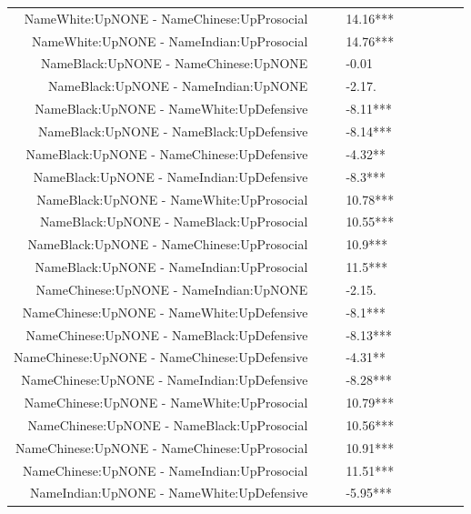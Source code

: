 \documentclass[]{report}
\begin{document}
\begin{table}[ht]
{\begin{tabular}{rllllllll}
		NameWhite:UpNONE - NameChinese:UpProsocial &  &  & 14.16*** &  &  &  &  &  \\ 
		NameWhite:UpNONE - NameIndian:UpProsocial &  &  & 14.76*** &  &  &  &  &  \\ 
		NameBlack:UpNONE - NameChinese:UpNONE &  &  & -0.01 &  &  &  &  &  \\ 
		NameBlack:UpNONE - NameIndian:UpNONE &  &  & -2.17. &  &  &  &  &  \\ 
		NameBlack:UpNONE - NameWhite:UpDefensive &  &  & -8.11*** &  &  &  &  &  \\ 
		NameBlack:UpNONE - NameBlack:UpDefensive &  &  & -8.14*** &  &  &  &  &  \\ 
		NameBlack:UpNONE - NameChinese:UpDefensive &  &  & -4.32** &  &  &  &  &  \\ 
		NameBlack:UpNONE - NameIndian:UpDefensive &  &  & -8.3*** &  &  &  &  &  \\ 
		NameBlack:UpNONE - NameWhite:UpProsocial &  &  & 10.78*** &  &  &  &  &  \\ 
		NameBlack:UpNONE - NameBlack:UpProsocial &  &  & 10.55*** &  &  &  &  &  \\ 
		NameBlack:UpNONE - NameChinese:UpProsocial &  &  & 10.9*** &  &  &  &  &  \\ 
		NameBlack:UpNONE - NameIndian:UpProsocial &  &  & 11.5*** &  &  &  &  &  \\ 
		NameChinese:UpNONE - NameIndian:UpNONE &  &  & -2.15. &  &  &  &  &  \\ 
		NameChinese:UpNONE - NameWhite:UpDefensive &  &  & -8.1*** &  &  &  &  &  \\ 
		NameChinese:UpNONE - NameBlack:UpDefensive &  &  & -8.13*** &  &  &  &  &  \\ 
		NameChinese:UpNONE - NameChinese:UpDefensive &  &  & -4.31** &  &  &  &  &  \\ 
		NameChinese:UpNONE - NameIndian:UpDefensive &  &  & -8.28*** &  &  &  &  &  \\ 
		NameChinese:UpNONE - NameWhite:UpProsocial &  &  & 10.79*** &  &  &  &  &  \\ 
		NameChinese:UpNONE - NameBlack:UpProsocial &  &  & 10.56*** &  &  &  &  &  \\ 
		NameChinese:UpNONE - NameChinese:UpProsocial &  &  & 10.91*** &  &  &  &  &  \\ 
		NameChinese:UpNONE - NameIndian:UpProsocial &  &  & 11.51*** &  &  &  &  &  \\ 
		NameIndian:UpNONE - NameWhite:UpDefensive &  &  & -5.95*** &  &  &  &  &  \\ 

\end{tabular}}
\end{table}
\end{document}
